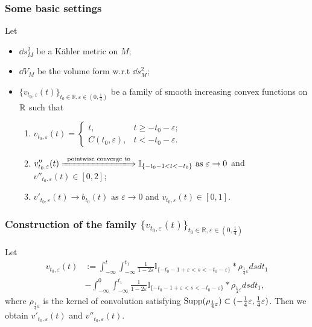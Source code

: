 \subsubsection{Some basic settings}
Let 
\begin{itemize}
  \item $\dd s_M^2$ be a K\"ahler metric on $M$;
  \item $\dd V_M$ be the volume form w.r.t $\dd s_M^2$;
  \item $\{v_{t_0,\varepsilon}(t)\}_{t_0\in\mathbb{R},\varepsilon\in (0,\frac 14)}$ be a family of smooth increasing convex functions on ${\mathbb R}$ such that 
  \begin{enumerate}[label=(\arabic*)]
    \item $v_{t_0,\varepsilon}(t)=\begin{cases}
      t, & t\geqslant -t_0-\varepsilon;\\ 
      C(t_0,\varepsilon), & t<-t_0-\varepsilon.
    \end{cases}$
    \item $v''_{t_0,\varepsilon}(t)\xLongrightarrow{\text{ pointwise converge to }} \bI_{\{-t_0-1<t<-t_0\}} \text{ as } \varepsilon\to 0$ and $v''_{t_0,\varepsilon}(t)\in [0,2]$;
    \item $v'_{t_0,\varepsilon}(t)\to b_{t_0}(t) \text{ as } \varepsilon\to 0$ and $v_{t_0,\varepsilon}(t)\in [0,1]$.
  \end{enumerate}
\end{itemize}
\subsubsection{Construction of the family \texorpdfstring{$\{v_{t_0,\varepsilon}(t)\}_{t_0\in\mathbb{R},\varepsilon\in (0,\frac 14)}$ }{}}
Let 
\begin{equation}
  \label{}
  \begin{split}
  v_{t_0,\varepsilon}(t)&:=\int_{-\infty}^{t}\int_{-\infty}^{t_{1}}\frac{1}
  {1-2\varepsilon}\mathbb{I}_{\{-t_{0}-1+\varepsilon< s<-t_{0}-\varepsilon\}}
  *\rho_{\frac{1}{4}\varepsilon}dsdt_{1}
  \\&-\int_{-\infty}^{0}\int_{-\infty}^{t_{1}}\frac{1}{1-2\varepsilon}
  \mathbb{I}_{\{-t_{0}-1+\varepsilon< s<-t_{0}-\varepsilon\}}*\rho_{\frac{1}{4}\varepsilon}dsdt_{1},
  \end{split}
  \end{equation}
  where $\rho_{\frac{1}{4}\varepsilon}$ is the kernel of convolution satisfying $\operatorname{Supp}(\rho_{\frac{1}{4}\varepsilon})
  \subset (-\frac{1}{4}\varepsilon,\frac{1}{4}\varepsilon)$.
Then we obtain $v'_{t_0,\varepsilon}(t)$ and $v''_{t_0,\varepsilon}(t)$.
